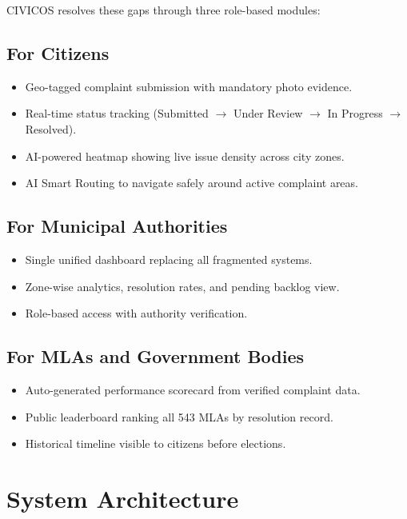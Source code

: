 \documentclass[12pt,a4paper]{report}
\begin{document}
CIVICOS resolves these gaps through three role-based modules:

\subsection{For Citizens}

\begin{itemize}
    \item Geo-tagged complaint submission with mandatory photo evidence.
    \item Real-time status tracking (Submitted $\rightarrow$ Under Review
    $\rightarrow$ In Progress $\rightarrow$ Resolved).
    \item AI-powered heatmap showing live issue density across city zones.
    \item AI Smart Routing to navigate safely around active complaint areas.
\end{itemize}

\subsection{For Municipal Authorities}

\begin{itemize}
    \item Single unified dashboard replacing all fragmented systems.
    \item Zone-wise analytics, resolution rates, and pending backlog view.
    \item Role-based access with authority verification.
\end{itemize}

\subsection{For MLAs and Government Bodies}

\begin{itemize}
    \item Auto-generated performance scorecard from verified complaint data.
    \item Public leaderboard ranking all 543 MLAs by resolution record.
    \item Historical timeline visible to citizens before elections.
\end{itemize}

\section{System Architecture}
\end{document}

